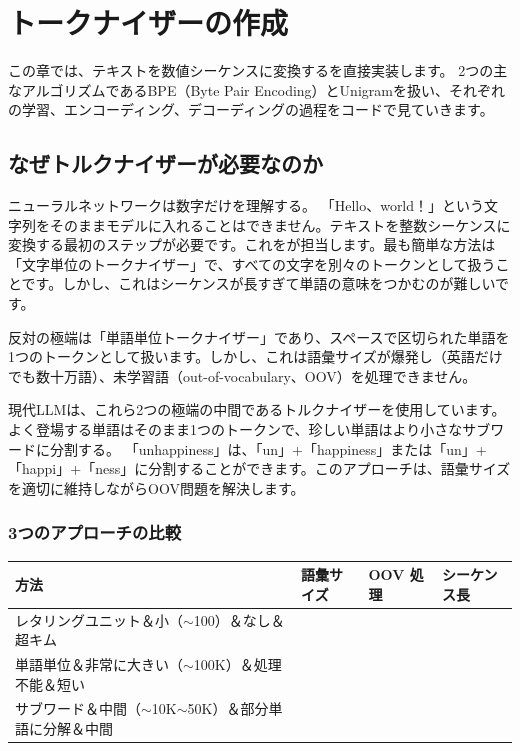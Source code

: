 \chapter{トークナイザーの作成}
\label{ch:tokenizer}

この章では、テキストを数値シーケンスに変換するを直接実装します。 2つの主なアルゴリズムであるBPE（Byte Pair Encoding）とUnigramを扱い、それぞれの学習、エンコーディング、デコーディングの過程をコードで見ていきます。

\section{なぜトルクナイザーが必要なのか}

ニューラルネットワークは数字だけを理解する。 「Hello、world！」という文字列をそのままモデルに入れることはできません。テキストを整数シーケンスに変換する最初のステップが必要です。これをが担当します。最も簡単な方法は「文字単位のトークナイザー」で、すべての文字を別々のトークンとして扱うことです。しかし、これはシーケンスが長すぎて単語の意味をつかむのが難しいです。

反対の極端は「単語単位トークナイザー」であり、スペースで区切られた単語を1つのトークンとして扱います。しかし、これは語彙サイズが爆発し（英語だけでも数十万語）、未学習語（out-of-vocabulary、OOV）を処理できません。

現代LLMは、これら2つの極端の中間であるトルクナイザーを使用しています。よく登場する単語はそのまま1つのトークンで、珍しい単語はより小さなサブワードに分割する。 「unhappiness」は、「un」+「happiness」または「un」+「happi」+「ness」に分割することができます。このアプローチは、語彙サイズを適切に維持しながらOOV問題を解決します。

\subsection{3つのアプローチの比較}

\begin{center}
\begin{tabularx}{\textwidth}{lXXX}
\toprule
\textbf{方法}&\textbf{語彙サイズ}&\textbf{OOV 処理}&\textbf{シーケンス長}\\
\midrule
レタリングユニット＆小（$\sim$100）＆なし＆超キム\\
単語単位＆非常に大きい（$\sim$100K）＆処理不能＆短い\\
サブワード＆中間（$\sim$10K$\sim$50K）＆部分単語に分解＆中間\\
\bottomrule
\end{tabularx}
\end{center}

